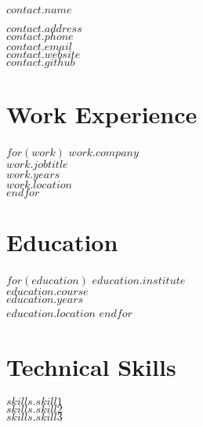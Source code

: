 \documentclass{cv-class}
\begin{document}
{\LARGE $contact.name$}\\
\smallskip

$contact.address$\\
$contact.phone$\\
$contact.email$\\
$contact.website$\\
$contact.github$

\section*{Work Experience}
$for(work)$
$work.company$\\
$work.jobtitle$\\
$work.years$\\
$work.location$\\
$endfor$

\section*{Education}
$for(education)$
$education.institute$\\
$education.course$\\
$education.years$\\
$education.location$
$endfor$

\section*{Technical Skills}
$skills.skill1$\\
$skills.skill2$\\
$skills.skill3$
\end{document}
